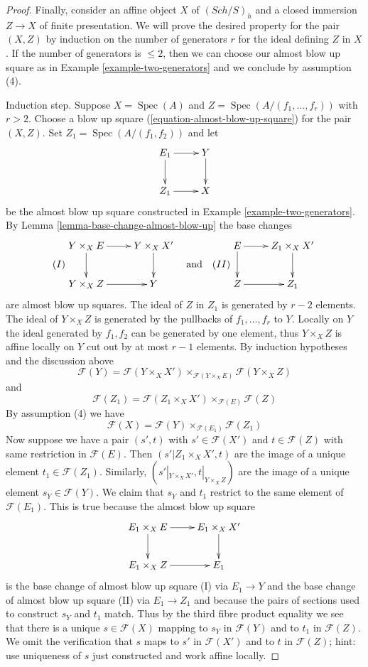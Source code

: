 \documentclass[10pt,a4paper]{amsart}
\theoremstyle{plain}
\theoremstyle{definition}
\theoremstyle{remark}
\numberwithin{equation}{subsection}
\def\Spec{\mathop{\mathrm{Spec}}}
\def\Sch{\mathit{Sch}}
\begin{document}
\begin{proof}
\medskip\noindent
Finally, consider an affine object $X$ of $(\Sch/S)_h$
and a closed immersion $Z \to X$ of finite presentation.
We will prove the desired property for the pair $(X, Z)$
by induction on the number of generators $r$ for the ideal
defining $Z$ in $X$. If the number of generators is $\leq 2$,
then we can choose our almost blow up square as
in Example \ref{example-two-generators}
and we conclude by assumption (4).

\medskip\noindent
Induction step. Suppose $X = \Spec(A)$ and $Z = \Spec(A/(f_1, \ldots, f_r))$
with $r > 2$. Choose a blow up square
(\ref{equation-almost-blow-up-square})
for the pair $(X, Z)$. Set $Z_1 = \Spec(A/(f_1, f_2))$
and let
$$
\xymatrix{
E_1 \ar[d] \ar[r] & Y \ar[d] \\
Z_1 \ar[r] & X
}
$$
be the almost blow up square constructed in
Example \ref{example-two-generators}.
By Lemma \ref{lemma-base-change-almost-blow-up} the base changes
$$
(I)
\vcenter{
\xymatrix{
Y \times_X E \ar[r] \ar[d] & Y \times_X X' \ar[d] \\
Y \times_X Z \ar[r] & Y
}
}
\quad\text{and}\quad
(II)
\vcenter{
\xymatrix{
E \ar[r] \ar[d] & Z_1 \times_X X' \ar[d] \\
Z \ar[r] & Z_1
}
}
$$
are almost blow up squares. The ideal of $Z$ in $Z_1$ is generated
by $r - 2$ elements. The ideal of $Y \times_X Z$
is generated by the pullbacks of $f_1, \ldots, f_r$ to $Y$. Locally on $Y$
the ideal generated by $f_1, f_2$ can be generated by
one element, thus $Y \times_X Z$ is affine locally on $Y$
cut out by at most $r - 1$ elements.
By induction hypotheses and the discussion above
$$
\mathcal{F}(Y) =
\mathcal{F}(Y \times_X X') \times_{\mathcal{F}(Y \times_X E)}
\mathcal{F}(Y \times_X Z)
$$
and
$$
\mathcal{F}(Z_1) =
\mathcal{F}(Z_1 \times_X X') \times_{\mathcal{F}(E)}
\mathcal{F}(Z)
$$
By assumption (4) we have
$$
\mathcal{F}(X) =
\mathcal{F}(Y) \times_{\mathcal{F}(E_1)} \mathcal{F}(Z_1)
$$
Now suppose we have a pair $(s', t)$ with $s' \in \mathcal{F}(X')$
and $t \in \mathcal{F}(Z)$ with same restriction in $\mathcal{F}(E)$.
Then $(s'|{Z_1 \times_X X'}, t)$ are the image of a unique element
$t_1 \in \mathcal{F}(Z_1)$. Similarly,
$(s'|_{Y \times_X X'}, t|_{Y \times_X Z})$ are the image of a
unique element $s_Y \in \mathcal{F}(Y)$.
We claim that $s_Y$ and $t_1$ restrict to the same element
of $\mathcal{F}(E_1)$. This is true because the almost blow up
square
$$
\xymatrix{
E_1 \times_X E \ar[r] \ar[d] & E_1 \times_X X' \ar[d] \\
E_1 \times_X Z \ar[r] & E_1
}
$$
is the base change of almost blow up square (I) via $E_1 \to Y$ and
the base change of almost blow up square (II) via $E_1 \to Z_1$ and
because the pairs of sections used to construct $s_Y$ and $t_1$ match.
Thus by the third fibre product equality we see that there is
a unique $s \in \mathcal{F}(X)$ mapping to $s_Y$ in $\mathcal{F}(Y)$
and to $t_1$ in $\mathcal{F}(Z)$.
We omit the verification that $s$ maps to $s'$ in $\mathcal{F}(X')$
and to $t$ in $\mathcal{F}(Z)$; hint: use uniqueness of $s$ just
constructed and work affine locally.
\end{proof}
\end{document}
